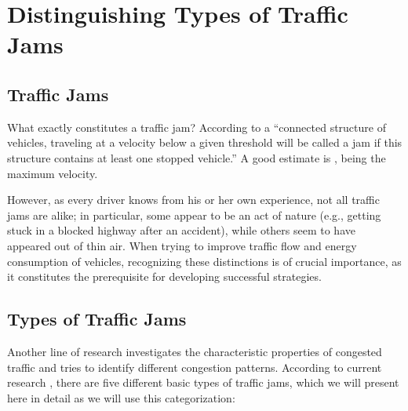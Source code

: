 \documentclass{acmrip}
\begin{document}
\iffalse
\begin{figure}[tp]
\centering \epsfig{file=screenshot0000.eps,
width=6cm}\\\vspace*{1cm} \epsfig{file=screenshot0001.eps,
width=6cm}
\ \\
\vspace*{1cm} \epsfig{file=screenshot0002.eps, width = 6cm}
\caption{\label{isola}\small Screenshots from the simulation of HDCs
for recognizing a traffic jam. Top: the front of the traffic jam.
Center: overview with front and end. Bottom: the end of the traffic
jam. }
\end{figure}
\fi




\section{Distinguishing Types of Traffic Jams}

\subsection{Traffic Jams}
What exactly constitutes a traffic jam?
    According to \cite{k-mmtfi-97} a
    ``connected structure of vehicles, traveling at a velocity below a
    given threshold  will be called a jam if this
    structure contains at least one stopped vehicle.'' A good
estimate is ,
 being the maximum velocity.

However, as every driver knows from his or her own experience, not
all traffic jams are alike; in particular, some appear to be an act
of nature (e.g., getting stuck in a blocked highway after an
accident), while others seem to have appeared out of thin air. When
trying to improve traffic flow and energy consumption of vehicles,
recognizing these distinctions is of crucial importance, as it
constitutes the prerequisite for developing successful strategies.

\subsection{Types of Traffic Jams}\label{subsec:types}
Another line of research investigates the characteristic properties
of congested traffic and tries to identify different congestion
patterns. According to current research \cite{sh-efctstitm-07},
there are five different basic types of traffic jams, which we will
present here in detail as we will use this categorization:
\end{document}
